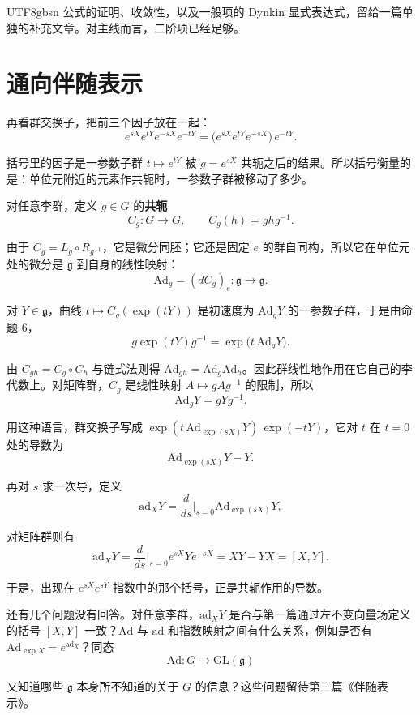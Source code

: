 \documentclass[11pt]{article}
\begin{document}
\begin{CJK*}{UTF8}{gbsn}
公式的证明、收敛性，以及一般项的 Dynkin 显式表达式，留给一篇单独的补充文章。对主线而言，二阶项已经足够。

\section{通向伴随表示}

再看群交换子，把前三个因子放在一起：
\[
e^{sX} e^{tY} e^{-sX} e^{-tY} = \bigl(e^{sX} e^{tY} e^{-sX}\bigr)\, e^{-tY}.
\]

括号里的因子是一参数子群 $t \mapsto e^{tY}$ 被 $g = e^{sX}$ 共轭之后的结果。所以括号衡量的是：单位元附近的元素作共轭时，一参数子群被移动了多少。

对任意李群，定义 $g \in G$ 的\textbf{共轭}
\[
C_g : G \to G, \qquad C_g(h) = g h g^{-1}.
\]

由于 $C_g = L_g \circ R_{g^{-1}}$，它是微分同胚；它还是固定 $e$ 的群自同构，所以它在单位元处的微分是 $\mathfrak{g}$ 到自身的线性映射：
\[
\mathrm{Ad}_g = (dC_g)_e : \mathfrak{g} \to \mathfrak{g}.
\]

对 $Y \in \mathfrak{g}$，曲线 $t \mapsto C_g(\exp(tY))$ 是初速度为 $\mathrm{Ad}_g Y$ 的一参数子群，于是由命题 6，
\[
g \exp(tY) g^{-1} = \exp\bigl(t\, \mathrm{Ad}_g Y\bigr).
\]

由 $C_{gh} = C_g \circ C_h$ 与链式法则得 $\mathrm{Ad}_{gh} = \mathrm{Ad}_g \mathrm{Ad}_h$。因此群线性地作用在它自己的李代数上。对矩阵群，$C_g$ 是线性映射 $A \mapsto gAg^{-1}$ 的限制，所以
\[
\mathrm{Ad}_g Y = g Y g^{-1}.
\]

用这种语言，群交换子写成 $\exp(t\,\mathrm{Ad}_{\exp(sX)} Y)\, \exp(-tY)$，它对 $t$ 在 $t = 0$ 处的导数为
\[
\mathrm{Ad}_{\exp(sX)} Y - Y.
\]

再对 $s$ 求一次导，定义
\[
\mathrm{ad}_X Y = \frac{d}{ds}\Big|_{s=0} \mathrm{Ad}_{\exp(sX)} Y,
\]

对矩阵群则有
\[
\mathrm{ad}_X Y = \frac{d}{ds}\Big|_{s=0} e^{sX} Y e^{-sX} = XY - YX = [X, Y].
\]

于是，出现在 $e^{sX}e^{sY}$ 指数中的那个括号，正是共轭作用的导数。

还有几个问题没有回答。对任意李群，$\mathrm{ad}_X Y$ 是否与第一篇通过左不变向量场定义的括号 $[X, Y]$ 一致？$\mathrm{Ad}$ 与 $\mathrm{ad}$ 和指数映射之间有什么关系，例如是否有 $\mathrm{Ad}_{\exp X} = e^{\mathrm{ad}_X}$？同态
\[
\mathrm{Ad} : G \to \mathrm{GL}(\mathfrak{g})
\]

又知道哪些 $\mathfrak{g}$ 本身所不知道的关于 $G$ 的信息？这些问题留待第三篇《伴随表示》。

\end{CJK*}
\end{document}

